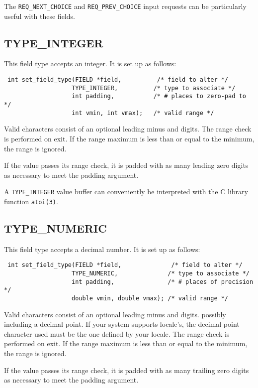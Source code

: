 The \texttt{REQ\_NEXT\_CHOICE} and \texttt{REQ\_PREV\_CHOICE} input requests
can be particularly useful with these fields.

\subsection{TYPE\_INTEGER}

\label{f0:ftype.integer}This field type accepts an integer.  It is set up as follows:
\begin{verbatim} int set_field_type(FIELD *field,          /* field to alter */
                   TYPE_INTEGER,          /* type to associate */
                   int padding,           /* # places to zero-pad to */
                   int vmin, int vmax);   /* valid range */
\end{verbatim}
Valid characters consist of an optional leading minus and digits.
The range check is performed on exit.  If the range maximum is less
than or equal to the minimum, the range is ignored. 

If the value passes its range check, it is padded with as many leading
zero digits as necessary to meet the padding argument. 

A \texttt{TYPE\_INTEGER} value buffer can conveniently be interpreted
with the C library function \texttt{atoi(3)}.

\subsection{TYPE\_NUMERIC}

\label{f0:ftype.numeric}This field type accepts a decimal number.  It is set up as follows:
\begin{verbatim} int set_field_type(FIELD *field,              /* field to alter */
                   TYPE_NUMERIC,              /* type to associate */
                   int padding,               /* # places of precision */
                   double vmin, double vmax); /* valid range */
\end{verbatim}
Valid characters consist of an optional leading minus and digits. possibly
including a decimal point. If your system supports locale's, the decimal point
character used must be the one defined by your locale. The range check is
performed on exit. If the range maximum is less than or equal to the minimum,
the range is ignored. 

If the value passes its range check, it is padded with as many trailing
zero digits as necessary to meet the padding argument. 

